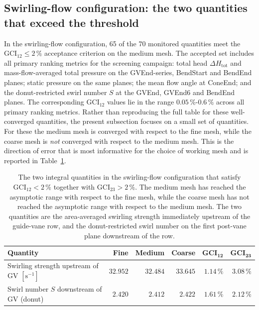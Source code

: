 \subsection{Swirling-flow configuration: the two quantities that exceed the threshold}
\label{sec:gci_swirl}

In the swirling-flow configuration, 65 of the 70 monitored quantities meet the $\mathrm{GCI}_{12} \leq 2\,\%$ acceptance criterion on the medium mesh. The accepted set includes all primary ranking metrics for the screening campaign: total head $\Delta H_{\mathrm{tot}}$ and mass-flow-averaged total pressure on the GVEnd-series, BendStart and BendEnd planes; static pressure on the same planes; the mean flow angle at ConeEnd; and the donut-restricted swirl number $S$ at the GVEnd, GVEnd6 and BendEnd planes. The corresponding $\mathrm{GCI}_{12}$ values lie in the range $0.05\,\%$-$0.6\,\%$ across all primary ranking metrics. Rather than reproducing the full table for these well-converged quantities, the present subsection focuses on a small set of quantities. For these the medium mesh is converged with respect to the fine mesh, while the coarse mesh is \emph{not} converged with respect to the medium mesh. This is the direction of error that is most informative for the choice of working mesh and is reported in Table~\ref{tab:gci_swirl_keep}.

\begin{table}[h!]
  \centering
  \caption[GCI - swirling-flow configuration: quantities exceeding the $2\,\%$ threshold]{The two integral quantities in the swirling-flow configuration that satisfy $\mathrm{GCI}_{12} < 2\,\%$ together with $\mathrm{GCI}_{23} > 2\,\%$. The medium mesh has reached the asymptotic range with respect to the fine mesh, while the coarse mesh has not reached the asymptotic range with respect to the medium mesh. The two quantities are the area-averaged swirling strength immediately upstream of the guide-vane row, and the donut-restricted swirl number on the first post-vane plane downstream of the row.}
  \label{tab:gci_swirl_keep}
  \small
  \begin{tabular}{l r r r r r}
    \toprule
    \textbf{Quantity}                                            & \textbf{Fine}  & \textbf{Medium} & \textbf{Coarse} & $\mathbf{GCI_{12}}$ & $\mathbf{GCI_{23}}$ \\
    \midrule
    Swirling strength upstream of GV $[\mathrm{s}^{-1}]$         & $32.952$       & $32.484$        & $33.645$        & $1.14\,\%$ & $\mathbf{3.08\,\%}$ \\
    Swirl number $S$ downstream of GV (donut)                    & $2.420$        & $2.412$         & $2.422$         & $1.61\,\%$ & $\mathbf{2.12\,\%}$ \\
    \bottomrule
  \end{tabular}
\end{table}

